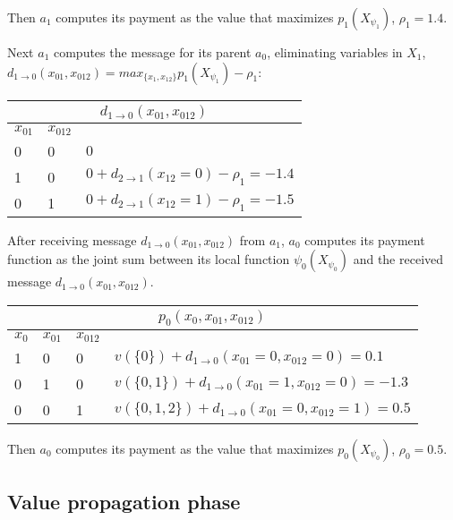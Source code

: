 \documentclass{article}
\begin{document}
\vspace{0.1in}\noindent Then $a_1$ computes its payment as the value that
maximizes $p_1(X_{\psi_1})$, $\rho_1 = 1.4$.

\vspace{0.1in}\noindent Next $a_1$ computes the message for its parent $a_0$,
eliminating variables in $X_1$, $d_{1\rightarrow 0}(x_{01},x_{012}) = max_{\{x_{1},x_{12}\}}
p_1(X_{\psi_1}) -\rho_1$:

\noindent\begin{tabular}{ | l | l |  l |}
\multicolumn{3}{c}{$d_{1\rightarrow 0}(x_{01},x_{012})$}  \\
\hline
	 $x_{01}$ & $x_{012}$ &  \\
\hline
	  0 &  0 & $0$ \\
	  1	&  0 & $0+ d_{2\rightarrow 1}(x_{12}=0)-\rho_1=-1.4$  \\
	  0 &  1 & $0+ d_{2\rightarrow 1}(x_{12}=1)-\rho_1=-1.5$ \\
\hline
\end{tabular}

\vspace{0.1in}\noindent After receiving message $d_{1\rightarrow
0}(x_{01},x_{012})$ from $a_1$, $a_0$ computes its payment function as the joint sum between its local
function $\psi_0(X_{\psi_0})$ and the received message $d_{1\rightarrow 0}(x_{01},x_{012})$.


\noindent\begin{tabular}{ | l | l |  l | l | }
\multicolumn{4}{c}{$p_0(x_{0},x_{01},x_{012})$}  \\
\hline
	$x_{0}$ &	$x_{01}$ & $x_{012}$ &   \\
\hline
	1	 &		0	 &  0	&   $v(\{0\})+ d_{1\rightarrow 0}(x_{01}=0,x_{012}=0)= 0.1$  \\
	0	 &		1	 &	0 	&   $v(\{0,1\})+ d_{1\rightarrow 0}(x_{01}=1,x_{012}=0)=-1.3$ \\
	0	 &		0	 &  1	&   $v(\{0,1,2\})+ d_{1\rightarrow 0}(x_{01}=0,x_{012}=1)=0.5$ 
	\\
\hline
\end{tabular}


\vspace{0.1in}\noindent Then $a_0$ computes its payment as the value that
maximizes $p_0(X_{\psi_0})$, $\rho_0 = 0.5$.

\subsection{Value propagation phase}
\end{document}
